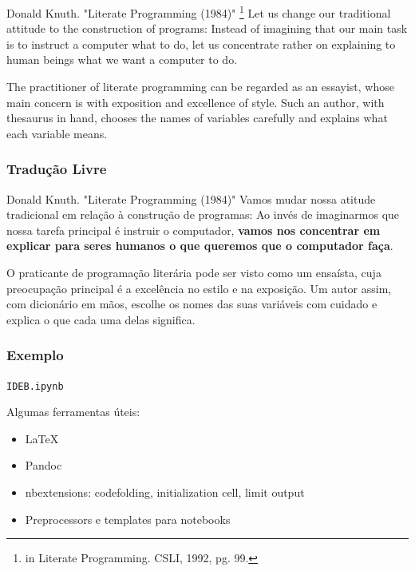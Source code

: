\documentclass[10pt]{beamer}
\begin{document}
\begin{frame}
  \frametitle{}
  \begin{center}
    \begin{block}
      {Donald Knuth. "Literate Programming (1984)" \footnote{in Literate Programming. CSLI, 1992, pg. 99.}}
      Let us change our traditional attitude to the construction of programs: Instead of imagining that our main task is to instruct a computer what to do, let us concentrate rather on explaining to human beings what we want a computer to do.
      
      The practitioner of literate programming can be regarded as an essayist, whose main concern is with exposition and excellence of style. Such an author, with thesaurus in hand, chooses the names of variables carefully and explains what each variable means.
    \end{block}
  \end{center}
\end{frame}

\begin{frame}
  \frametitle{Tradução Livre}
  \begin{center}
    \begin{block}
      {Donald Knuth. "Literate Programming (1984)" }
      Vamos mudar nossa atitude tradicional em relação à construção de programas: Ao invés de imaginarmos que nossa tarefa principal é instruir o computador, \textbf{vamos nos concentrar em explicar para seres humanos o que queremos que o computador faça}.
      
      O praticante de programação literária pode ser visto como um ensaísta, cuja preocupação principal é a excelência no estilo e na exposição. Um autor assim, com dicionário em mãos, escolhe os nomes das suas variáveis com cuidado e explica o que cada uma delas significa.
    \end{block}
  \end{center}
\end{frame}

\begin{frame}[fragile]
  \frametitle{Exemplo}
     \begin{center}
      \begin{minipage}{0.7\textwidth}
      \begin{block}{}
         \begin{center}
              \verb+IDEB.ipynb+
         \end{center}
      \end{block}
    \end{minipage}
   \end{center}
   \vfill
   Algumas ferramentas úteis:
   \begin{itemize}
   \item \LaTeX
   \item Pandoc
   \item nbextensions: codefolding, initialization cell, limit output
   \item Preprocessors e templates para notebooks
   \end{itemize}
\end{frame}
\end{document}
